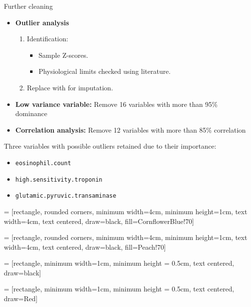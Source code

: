 \documentclass[aspectratio=169,xcolor=dvipsnames]{beamer}
\begin{document}

\begin{frame}{Further cleaning}
\begin{itemize}
    \item \textbf{Outlier analysis}
    \begin{enumerate}
        \item Identification:
            \begin{itemize}
                \item Sample Z-scores.
                \item Physiological limits checked using literature.
            \end{itemize}
        \item Replace with  for imputation.
    \end{enumerate}
    \pause
    \item \textbf{Low variance variable:}
    Remove \alert{16} variables with more than \alert{95\% dominance}
    \pause
    \item \textbf{Correlation analysis:}
    Remove \alert{12} variables with more than \alert{85\% correlation}
\end{itemize}
\pause
Three variables with possible outliers retained due to their importance:
\begin{itemize}
    \item \texttt{eosinophil.count}
    \item \texttt{high.sensitivity.troponin}
    \item \texttt{glutamic.pyruvic.transaminase}
\end{itemize}

\end{frame}
 = [rectangle, rounded corners, 
minimum width=4cm, 
minimum height=1cm,
text width=4cm,
text centered, 
draw=black, 
fill=CornflowerBlue!70]

 = [rectangle, rounded corners, 
minimum width=4cm, 
minimum height=1cm,
text width=4cm,
text centered, 
draw=black, 
fill=Peach!70]

 = [rectangle, 
minimum width=1cm, 
minimum height = 0.5cm,
text centered, 
draw=black]

 = [rectangle, 
minimum width=1cm, 
minimum height = 0.5cm,
text centered, 
draw=Red]
\end{document}
